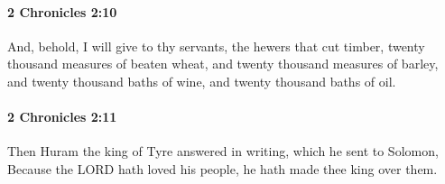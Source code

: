		\paragraph{2 Chronicles 2:10} %
			\label{2CHRONICLES-2-10}

			And, behold, I will give to thy servants, the hewers that cut timber, twenty thousand measures of beaten wheat, and twenty thousand measures of barley, and twenty thousand baths of wine, and twenty thousand baths of oil.


		\paragraph{2 Chronicles 2:11} %
			\label{2CHRONICLES-2-11}

			Then Huram the king of Tyre answered in writing, which he sent to Solomon, Because the LORD hath loved his people, he hath made thee king over them.

